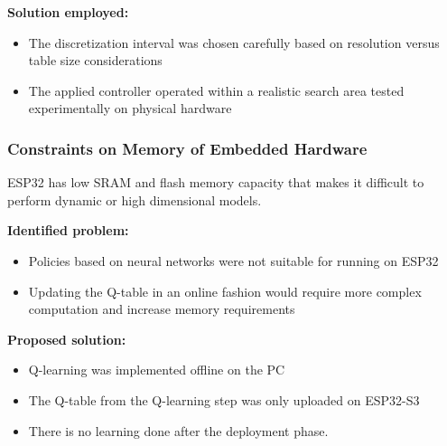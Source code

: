 \textbf{Solution employed:}
\begin{itemize}
\item The discretization interval was chosen carefully based on resolution versus table size considerations
\item The applied controller operated within a realistic search area tested experimentally on physical hardware
\end{itemize}

\subsubsection{Constraints on Memory of Embedded Hardware}

ESP32 has low SRAM and flash memory capacity that makes it difficult to perform dynamic or high dimensional models.

\textbf{Identified problem:}
\begin{itemize}
\item Policies based on neural networks were not suitable for running on ESP32
\item Updating the Q-table in an online fashion would require more complex computation and increase memory requirements
\end{itemize}

\textbf{Proposed solution:}
\begin{itemize}
\item Q-learning was implemented offline on the PC
\item The Q-table from the Q-learning step was only uploaded on ESP32-S3
\item There is no learning done after the deployment phase.
\end{itemize}